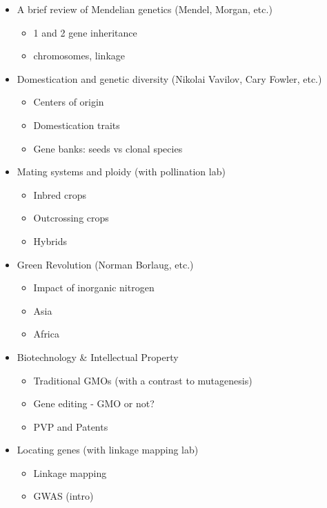 \documentclass[10pt]{article}
\begin{document}
\begin{itemize}

	\item A brief review of Mendelian genetics (Mendel, Morgan, etc.)
	\begin{itemize}
		\item 1 and 2 gene inheritance
		\item chromosomes, linkage
	\end{itemize} 

	\item Domestication and genetic diversity (Nikolai Vavilov, Cary Fowler, etc.)
	\begin{itemize}
		\item Centers of origin 
		\item Domestication traits
		\item Gene banks: seeds vs clonal species
	\end{itemize} 

	\item Mating systems and ploidy (with pollination lab)
	\begin{itemize}
		\item Inbred crops
		\item Outcrossing crops
		\item Hybrids  
	\end{itemize} 

	\item Green Revolution (Norman Borlaug, etc.)
	\begin{itemize}
		\item Impact of inorganic nitrogen
		\item Asia
		\item Africa
	\end{itemize} 

	\item Biotechnology \& Intellectual Property
	\begin{itemize}
		\item Traditional GMOs (with a contrast to mutagenesis)
		\item Gene editing - GMO or not?
		\item PVP and Patents 
	\end{itemize}

	\item Locating genes (with linkage mapping lab)
	\begin{itemize}
		\item Linkage mapping 
		\item GWAS (intro)
	\end{itemize} 


\end{itemize}
\end{document}
